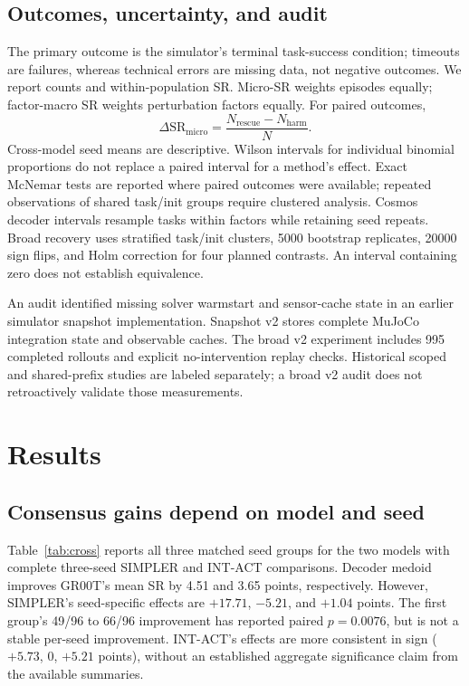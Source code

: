 \subsection{Outcomes, uncertainty, and audit}
The primary outcome is the simulator's terminal task-success condition;
timeouts are failures, whereas technical errors are missing data, not
negative outcomes. We report counts and within-population SR. Micro-SR
weights episodes equally; factor-macro SR weights perturbation factors equally.
For paired outcomes,
\begin{equation}
\Delta\mathrm{SR}_{\mathrm{micro}}=
\frac{N_{\mathrm{rescue}}-N_{\mathrm{harm}}}{N}.
\end{equation}
Cross-model seed means are descriptive. Wilson intervals for individual
binomial proportions do not replace a paired interval for a method's effect.
Exact McNemar tests are reported where paired outcomes were available;
repeated observations of shared task/init groups require clustered analysis.
Cosmos decoder intervals resample tasks within factors while retaining seed
repeats. Broad recovery uses stratified task/init clusters, 5000 bootstrap
replicates, 20000 sign flips, and Holm correction for four planned contrasts.
An interval containing zero does not establish equivalence.

An audit identified missing solver warmstart and sensor-cache state in an
earlier simulator snapshot implementation. Snapshot v2 stores complete MuJoCo
integration state and observable caches. The broad v2 experiment includes
995 completed rollouts and explicit no-intervention replay checks. Historical
scoped and shared-prefix studies are labeled separately; a broad v2 audit
does not retroactively validate those measurements.
\ScopedRuntimeStatus

\section{Results}
\subsection{Consensus gains depend on model and seed}
Table~\ref{tab:cross} reports all three matched seed groups for the two
models with complete three-seed SIMPLER and INT-ACT comparisons. Decoder
medoid improves GR00T's mean SR by 4.51 and 3.65 points, respectively.
However, SIMPLER's seed-specific effects are $+17.71$, $-5.21$, and $+1.04$
points. The first group's 49/96 to 66/96 improvement has reported paired
$p=0.0076$, but is not a stable per-seed improvement. INT-ACT's effects
are more consistent in sign ($+5.73$, $0$, $+5.21$ points), without an
established aggregate significance claim from the available summaries.

